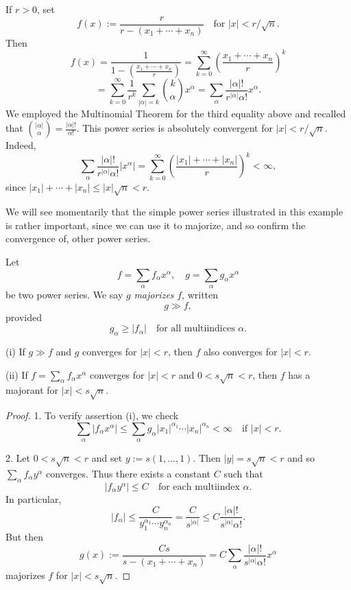 \begin{example}
\label{ex:real-analytic-example-rational-function}
If $r > 0$, set
$$f(x) := \frac{r}{r - (x_1 + \cdots + x_n)} \quad \text{for } |x| < r/\sqrt{n}.$$
Then
$$f(x) = \frac{1}{1 - \left(\frac{x_1+\cdots+x_n}{r}\right)} = \sum_{k=0}^\infty \left(\frac{x_1 + \cdots + x_n}{r}\right)^k$$
$$= \sum_{k=0}^\infty \frac{1}{r^k} \sum_{|\alpha|=k} \binom{k}{\alpha} x^\alpha = \sum_\alpha \frac{|\alpha|!}{r^{|\alpha|} \alpha!} x^\alpha.$$
We employed the Multinomial Theorem for the third equality above and recalled that $\binom{|\alpha|}{\alpha}=\frac{|\alpha|!}{\alpha!}$. This power series is absolutely convergent for $|x|<r/\sqrt n$. Indeed,
$$\sum_\alpha \frac{|\alpha|!}{r^{|\alpha|}\alpha!}|x^\alpha| = \sum_{k=0}^\infty \left(\frac{|x_1|+\cdots+|x_n|}{r}\right)^k < \infty,$$
since $|x_1|+\cdots+|x_n|\le |x|\sqrt n < r$.
\end{example}

We will see momentarily that the simple power series illustrated in this example is rather important, since we can use it to majorize, and so confirm the convergence of, other power series.

\begin{definition}[Majorizes]
\label{def:power-series-majorizes}
Let
$$f = \sum_\alpha f_\alpha x^\alpha, \quad g = \sum_\alpha g_\alpha x^\alpha$$
be two power series. We say $g$ \textit{majorizes} $f$, written
$$g \gg f,$$
provided
$$g_\alpha \ge |f_\alpha| \quad \text{for all multiindices } \alpha.$$
\end{definition}

\begin{lemma}[Majorants]
\label{lem:power-series-majorants}
(i) If $g\gg f$ and $g$ converges for $|x|<r$, then $f$ also converges for $|x|<r$.

(ii) If $f=\sum_\alpha f_\alpha x^\alpha$ converges for $|x|<r$ and $0<s\sqrt n<r$, then $f$ has a majorant for $|x|<s\sqrt n$.
\end{lemma}
\begin{proof}
1. To verify assertion (i), we check
$$\sum_\alpha |f_\alpha x^\alpha| \le \sum_\alpha g_\alpha|x_1|^{\alpha_1}\cdots|x_n|^{\alpha_n} < \infty \quad \text{if } |x|<r.$$

2. Let $0<s\sqrt n<r$ and set $y:=s(1,\ldots,1)$. Then $|y|=s\sqrt n<r$ and so $\sum_\alpha f_\alpha y^\alpha$ converges. Thus there exists a constant $C$ such that
$$|f_\alpha y^\alpha| \le C \quad \text{for each multiindex } \alpha.$$
In particular,
$$|f_\alpha| \le \frac{C}{y_1^{\alpha_1}\cdots y_n^{\alpha_n}} = \frac{C}{s^{|\alpha|}} \le C\frac{|\alpha|!}{s^{|\alpha|}\alpha!}.$$
But then
$$g(x) := \frac{Cs}{s-(x_1+\cdots+x_n)} = C\sum_\alpha \frac{|\alpha|!}{s^{|\alpha|}\alpha!}x^\alpha$$
majorizes $f$ for $|x|<s\sqrt n$.
\end{proof}

